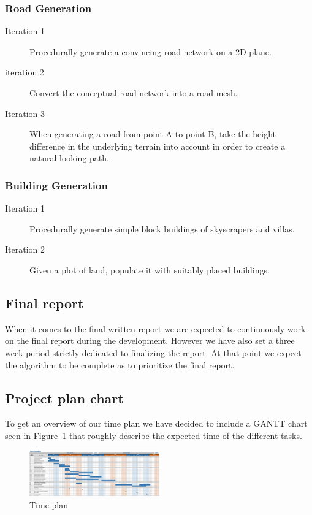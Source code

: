\subsubsection{Road Generation}
\begin{description}
  \item[Iteration 1] Procedurally generate a convincing road-network on a 2D plane.
  \item[iteration 2] Convert the conceptual road-network into a road mesh.
  \item[Iteration 3] When generating a road from point A to point B, take the height difference in the underlying terrain into account in order to create a natural looking path.
\end{description}

\subsubsection{Building Generation}
\begin{description}
  \item[Iteration 1] Procedurally generate simple block buildings of skyscrapers and villas.
  \item[Iteration 2] Given a plot of land, populate it with suitably placed buildings.
\end{description}

\subsection{Final report}
When it comes to the final written report we are expected to continuously work on the final report during the development.
However we have also set a three week period strictly dedicated to finalizing the report.
At that point we expect the algorithm to be complete as to prioritize the final report.

\subsection{Project plan chart}
To get an overview of our time plan we have decided to include a GANTT chart seen in Figure~\ref{fig:time-plan} that roughly describe the expected time of the different tasks.

\newpage
\begin{figure}[H]
  \centering
  \vspace*{-1.0cm}
  \includegraphics[angle=90, width=0.5\textwidth]{figure/time-plan.png}
  \caption{Time plan}
  \label{fig:time-plan}
\end{figure}

